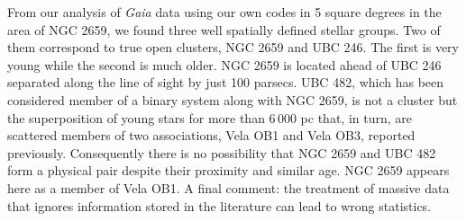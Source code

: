 \documentclass[baaa]{baaa}
\begin{document}
 From our analysis of \textit{Gaia} data using our own codes in 5 square degrees in the area of NGC 2659, we found three well spatially defined stellar groups. Two of them correspond to true open clusters, NGC 2659 and UBC 246. The first is very young while the second is much older. NGC 2659 is located ahead of UBC 246 separated along the line of sight by just 100 parsecs. UBC 482, which has been considered member of a binary system along with NGC 2659, is not a cluster but the superposition of young stars for more than $6\,000$ pc that, in turn, are scattered members of two associations, Vela OB1 and Vela OB3, reported previously. Consequently there is no possibility that NGC 2659 and UBC 482 form a physical pair despite their proximity and similar age. NGC 2659 appears here as a member of Vela OB1. A final comment: the treatment of massive data that ignores information stored in the literature can lead to wrong statistics.  


\small

\end{document}
